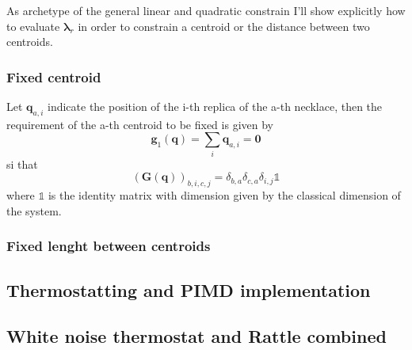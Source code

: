 \documentclass[10pt,a4paper]{article}
\begin{document}
As archetype of the general linear and quadratic constrain I'll show explicitly how to evaluate $\bm{\lambda}_r$ in order to constrain a centroid or the distance between two centroids.
\subsubsection{Fixed centroid}
Let $\bm{q}_{a,i}$ indicate the position of the i-th replica of the a-th necklace, then the requirement of the a-th centroid to be fixed is given by
\[\bm{g}_1 (\bm{q})= \sum_i \bm{q}_{a,i} = 	\bm0 \]
si that
\[(\bm{G}(\bm{q}))_{b,i,c,j} = \delta_{b,a}\delta_{c,a} \delta_{i,j}  \mathbb{1}  \]
where $\mathbb{1}$ is the identity matrix with dimension given by the classical dimension of the system.

\subsubsection{Fixed lenght between centroids}
\subsection{Thermostatting and PIMD implementation}
\subsection{White noise thermostat and Rattle combined}
\end{document}
